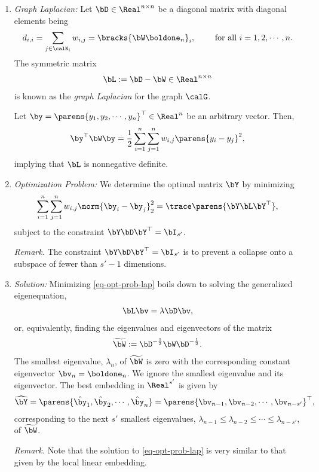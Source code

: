\documentclass[12pt]{article}
\begin{document}
\begin{enumerate}[label=\textbf{\arabic*.}]
	\begin{enumerate}
		\item \textit{Graph Laplacian:} Let $\bD \in \Real^{n \times n}$ be a diagonal matrix with diagonal elements being 
		\begin{align*}
			d_{i,i} = \sum_{j \in \calN_i} w_{i,j} = \bracks{\bW \boldone_n}_i, \qquad \text{ for all } i = 1, 2, \cdots, n. 
		\end{align*}
		The symmetric matrix 
		\begin{align*}
			\bL := \bD - \bW \in \Real^{n \times n}
		\end{align*}
		is known as the \emph{graph Laplacian} for the graph $\calG$. 
		
		Let $\by = \parens{y_1, y_2, \cdots, y_n}^\top \in \Real^n$ be an arbitrary vector. Then, 
		\begin{align*}
			\by^\top \bW \by = \frac{1}{2} \sum_{i=1}^n \sum_{j=1}^n w_{i,j} \parens{y_i - y_j}^2, 
		\end{align*}
		implying that $\bL$ is nonnegative definite. 
		
		\item \textit{Optimization Problem:} We determine the optimal matrix $\bY$ by minimizing 
		\begin{align}\label{eq-opt-prob-lap}
			\sum_{i=1}^n \sum_{j=1}^n w_{i,j} \norm{\by_i - \by_j}_2^2 = \trace \parens{\bY \bL \bY^\top}, 
		\end{align} 
		subject to the constraint $\bY \bD \bY^\top = \bI_{s'}$. 
		
		\textit{Remark.} The constraint $\bY \bD \bY^\top = \bI_{s'}$ is to prevent a collapse onto a subspace of fewer than $s' - 1$ dimensions. 
		
		\item \textit{Solution:} Minimizing \eqref{eq-opt-prob-lap} boils down to solving the generalized eigenequation, 
		\begin{align*}
			\bL \bv = \lambda \bD \bv, 
		\end{align*}
		or, equivalently, finding the eigenvalues and eigenvectors of the matrix 
		\begin{align*}
			\widetilde{\bW} := \bD^{-\frac{1}{2}} \bW \bD^{-\frac{1}{2}}. 
		\end{align*}
		The smallest eigenvalue, $\lambda_n$, of $\widetilde{\bW}$ is zero with the corresponding constant eigenvector $\bv_n = \boldone_n$. We ignore the smallest eigenvalue and its eigenvector. The best embedding in $\Real^{s'}$ is given by 
		\begin{align*}
			\widehat{\bY} = \parens{\hat{\by}_1, \hat{\by}_2, \cdots, \hat{\by}_n} = \parens{\bv_{n-1}, \bv_{n-2}, \cdots, \bv_{n-s'}}^\top, 
		\end{align*}
		corresponding to the next $s'$ smallest eigenvalues, $\lambda_{n-1} \le \lambda_{n-2} \le \cdots \le \lambda_{n-s'}$, of $\widetilde{\bW}$. 
		
		\textit{Remark.} Note that the solution to \eqref{eq-opt-prob-lap} is very similar to that given by the local linear embedding. 
	\end{enumerate}
	
\end{enumerate}
\end{document}
